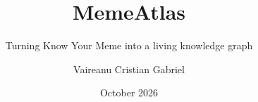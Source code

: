 \documentclass[aspectratio=169,11pt]{beamer}
\title{MemeAtlas}
\subtitle{Turning Know Your Meme into a living knowledge graph}
\author{Vaireanu Cristian Gabriel}
\institute{LIRIS --- CNRS}      %
\date{October 2026}             %
\begin{document}












\ifgmbackup
  \appendix
  
\fi
\end{document}
